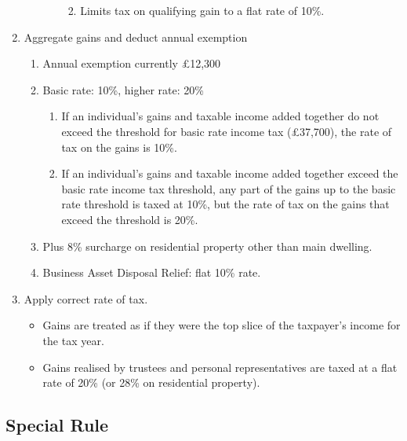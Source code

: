 \documentclass[
]{article}
\providecommand{\tightlist}{%
  \setlength{\itemsep}{0pt}\setlength{\parskip}{0pt}}
\begin{document}
\begin{enumerate}
\begin{enumerate}
\begin{enumerate}
      \begin{enumerate}
      \def\labelenumiv{\arabic{enumiv}.}
      \tightlist
      \item
        Limits tax on qualifying gain to a flat rate of 10\%.
      \end{enumerate}
    \end{enumerate}
  \end{enumerate}
\item
  Aggregate gains and deduct annual exemption

  \begin{enumerate}
  \def\labelenumii{\arabic{enumii}.}
  \tightlist
  \item
    Annual exemption currently £12,300
  \item
    Basic rate: 10\%, higher rate: 20\%

    \begin{enumerate}
    \def\labelenumiii{\arabic{enumiii}.}
    \tightlist
    \item
      If an individual's gains and taxable income added together do not
      exceed the threshold for basic rate income tax (£37,700), the rate
      of tax on the gains is 10\%.
    \item
      If an individual's gains and taxable income added together exceed
      the basic rate income tax threshold, any part of the gains up to
      the basic rate threshold is taxed at 10\%, but the rate of tax on
      the gains that exceed the threshold is 20\%.
    \end{enumerate}
  \item
    Plus 8\% surcharge on residential property other than main dwelling.
  \item
    Business Asset Disposal Relief: flat 10\% rate.
  \end{enumerate}
\item
  Apply correct rate of tax.

  \begin{itemize}
  \tightlist
  \item
    Gains are treated as if they were the top slice of the taxpayer's
    income for the tax year.
  \item
    Gains realised by trustees and personal representatives are taxed at
    a flat rate of 20\% (or 28\% on residential property).
  \end{itemize}
\end{enumerate}

\hypertarget{special-rule}{%
\subsection{Special Rule}\label{special-rule}}
\end{document}
